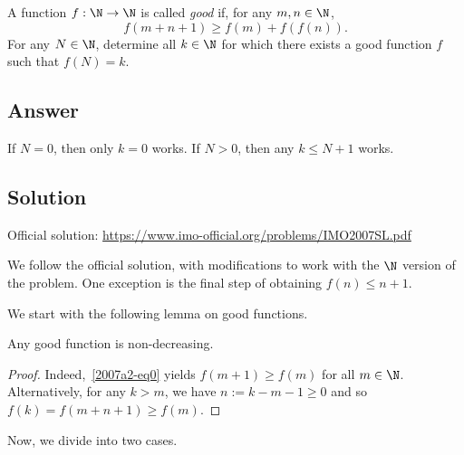A function $f : \N \to \N$ is called \textit{good} if, for any $m, n \in \N$,
\[ f(m + n + 1) \geq f(m) + f(f(n)). \tag{*}\label{2007a2-eq0} \]
For any $N \in \N$, determine all $k \in \N$ for which there exists a good function $f$ such that $f(N) = k$.



\subsection*{Answer}

If $N = 0$, then only $k = 0$ works.
If $N > 0$, then any $k \leq N + 1$ works.



\subsection*{Solution}

Official solution: \url{https://www.imo-official.org/problems/IMO2007SL.pdf}

We follow the official solution, with modifications to work with the $\N$ version of the problem.
One exception is the final step of obtaining $f(n) \leq n + 1$.

We start with the following lemma on good functions.

\begin{lemma}\label{2007a2-1}
Any good function is non-decreasing.
\end{lemma}
\begin{proof}
Indeed,~\eqref{2007a2-eq0} yields $f(m + 1) \geq f(m)$ for all $m \in \N$.
Alternatively, for any $k > m$, we have $n := k - m - 1 \geq 0$ and so $f(k) = f(m + n + 1) \geq f(m)$.
\end{proof}

Now, we divide into two cases.

